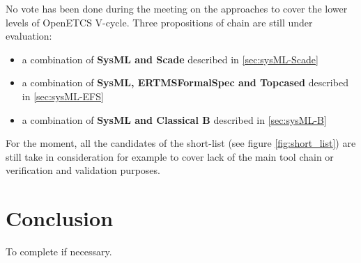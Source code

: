 No vote has been done during the meeting on the approaches to cover the lower  levels of OpenETCS V-cycle.
Three propositions of chain are still under evaluation:

\begin{itemize}
\item a combination of \textbf{SysML  and Scade} described in \ref{sec:sysML-Scade}
\item a combination of \textbf{SysML, ERTMSFormalSpec and Topcased} described in \ref{sec:sysML-EFS}
\item a combination of \textbf{SysML  and Classical B} described in \ref{sec:sysML-B}
\end{itemize}

For the moment, all the candidates of the short-list (see figure \ref{fig:short_list}) are still take in consideration for example to  cover lack  of the main tool chain or verification and validation purposes.

\section{Conclusion}


\begin{todo_comment}
To  complete if necessary.
\end{todo_comment}
